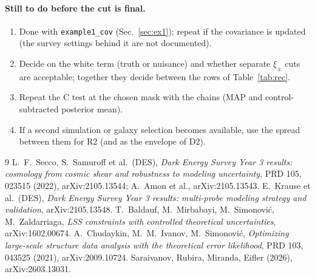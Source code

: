 \documentclass[11pt]{article}
\begin{document}
\paragraph{Still to do before the cut is final.}
\begin{enumerate}[itemsep=1pt]
\item Done with \texttt{example1\_cov} (Sec.~\ref{sec:ex1}); repeat if the
  covariance is updated (the survey settings behind it are not documented).
\item Decide on the white term (truth or nuisance) and whether separate
  $\xi_\pm$ cuts are acceptable; together they decide between the rows of
  Table~\ref{tab:rec}.
\item Repeat the C test at the chosen mask with the chains (MAP and
  control-subtracted posterior mean).
\item If a second simulation or galaxy selection becomes available, use the
  spread between them for R2 (and as the envelope of D2).
\end{enumerate}

\begin{thebibliography}{9}\small
{} L.~F.~Secco, S.~Samuroff et al.\ (DES), \emph{Dark Energy
Survey Year 3 results: cosmology from cosmic shear and robustness to modeling
uncertainty}, PRD 105, 023515 (2022), arXiv:2105.13544; A.~Amon et al.,
arXiv:2105.13543.
 E.~Krause et al.\ (DES), \emph{Dark Energy Survey Year 3
results: multi-probe modeling strategy and validation}, arXiv:2105.13548.
 T.~Baldauf, M.~Mirbabayi, M.~Simonovi\'c, M.~Zaldarriaga,
\emph{LSS constraints with controlled theoretical uncertainties},
arXiv:1602.00674.
 A.~Chudaykin, M.~M.~Ivanov, M.~Simonovi\'c,
\emph{Optimizing large-scale structure data analysis with the theoretical
error likelihood}, PRD 103, 043525 (2021), arXiv:2009.10724.
 Saraivanov, Rubira, Miranda, Eifler (2026),
arXiv:2603.13031.
\end{thebibliography}

\appendix
\end{document}
